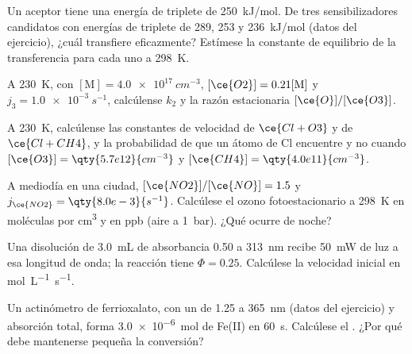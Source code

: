 \begin{exercise}[$\star\star$]\label{exo:b3:photochemistry:7}
Un aceptor tiene una energía de triplete de \qty{250}{kJ/mol}. De tres
sensibilizadores candidatos con energías de triplete de 289, 253 y \qty{236}{kJ/mol} (datos del
ejercicio), ¿cuál transfiere eficazmente? Estímese la constante de equilibrio de la
transferencia para cada uno a \qty{298}{K}.
\end{exercise}

\begin{exercise}[$\star\star$]\label{exo:b3:photochemistry:8}
A \qty{230}{K}, con $[\mathrm M] = \qty{4.0e17}{cm^{-3}}$, $[\ce{O2}] = 0.21[\mathrm M]$ y $j_3 = \qty{1.0e-3}{s^{-1}}$,
calcúlense $k_2$ y la razón estacionaria $[\ce{O}]/[\ce{O3}]$.
\end{exercise}

\begin{exercise}[$\star\star$]\label{exo:b3:photochemistry:9}
A \qty{230}{K}, calcúlense las constantes de velocidad de $\ce{Cl + O3}$ y de $\ce{Cl + CH4}$, y la
probabilidad de que un átomo de Cl encuentre  y no  cuando $[\ce{O3}] = \qty{5.7e12}{cm^{-3}}$
y $[\ce{CH4}] = \qty{4.0e11}{cm^{-3}}$.
\end{exercise}

\begin{exercise}[$\star\star\star$]\label{exo:b3:photochemistry:10}
A mediodía en una ciudad, $[\ce{NO2}]/[\ce{NO}] = 1.5$ y $j_{\ce{NO2}} = \qty{8.0e-3}{s^{-1}}$. Calcúlese el
ozono fotoestacionario a \qty{298}{K} en moléculas por \unit{cm^3} y en ppb (aire a \qty{1}{bar}).
¿Qué ocurre de noche?
\end{exercise}

\begin{exercise}[$\star\star\star$]\label{exo:b3:photochemistry:11}
Una disolución de \qty{3.0}{mL} de absorbancia 0.50 a \qty{313}{nm} recibe \qty{50}{mW} de
luz a esa longitud de onda; la reacción tiene $\Phi = 0.25$. Calcúlese la velocidad inicial en
\unit{mol.L^{-1}.s^{-1}}.
\end{exercise}

\begin{exercise}[$\star\star\star$]\label{exo:b3:photochemistry:12}
Un actinómetro de ferrioxalato, con un  de 1.25 a \qty{365}{nm} (datos del
ejercicio) y absorción total, forma \qty{3.0e-6}{mol} de Fe(II) en \qty{60}{s}.
Calcúlese el . ¿Por qué debe mantenerse pequeña la conversión?
\end{exercise}


